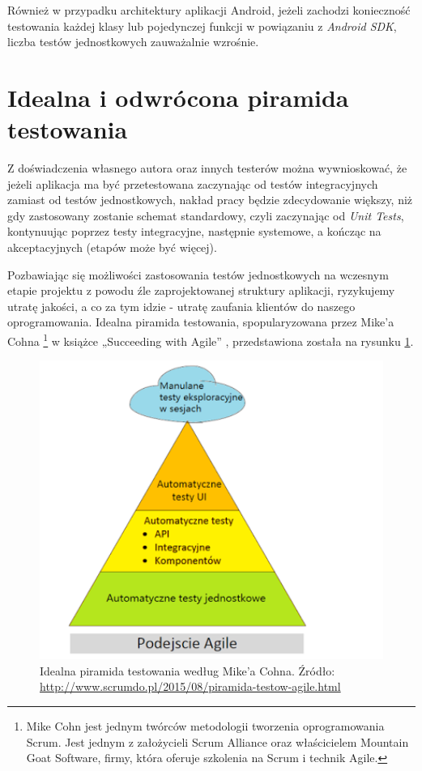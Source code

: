 Również w przypadku architektury aplikacji Android, jeżeli zachodzi konieczność testowania każdej klasy lub pojedynczej funkcji w powiązaniu z \textit{Android SDK}, liczba testów jednostkowych zauważalnie wzrośnie.

\section{Idealna i odwrócona piramida testowania}
\label{piramida_testowania}
Z doświadczenia własnego autora oraz innych testerów można wywnioskować, że jeżeli aplikacja ma być przetestowana zaczynając od testów integracyjnych zamiast od testów jednostkowych, nakład pracy będzie zdecydowanie większy, niż gdy zastosowany zostanie schemat standardowy, czyli zaczynając od \textit{Unit Tests}, kontynuując poprzez testy integracyjne, następnie systemowe, a kończąc na akceptacyjnych (etapów może być więcej). 

Pozbawiając się możliwości zastosowania testów jednostkowych na wczesnym etapie projektu z powodu źle zaprojektowanej struktury aplikacji, ryzykujemy utratę jakości, a co za tym idzie - utratę zaufania klientów do naszego oprogramowania. Idealna piramida testowania, spopularyzowana przez Mike’a Cohna \footnote{Mike Cohn jest jednym twórców metodologii tworzenia oprogramowania Scrum. Jest jednym z założycieli Scrum Alliance oraz właścicielem Mountain Goat Software, firmy, która oferuje szkolenia na Scrum i technik Agile.}  w książce „Succeeding with Agile” \cite{bib:cohn:agile}, przedstawiona została na rysunku \ref{fig:idealna_piramida}.

\begin{figure}[!htb]
    \centering
    \includegraphics[width=12cm]{imgs/ch3_idealna_piramida.png}
    \caption
{Idealna piramida testowania według Mike'a Cohna\cite{bib:cohn:agile}. Źródło: \url{http://www.scrumdo.pl/2015/08/piramida-testow-agile.html}}
    \label{fig:idealna_piramida}
\end{figure} 

